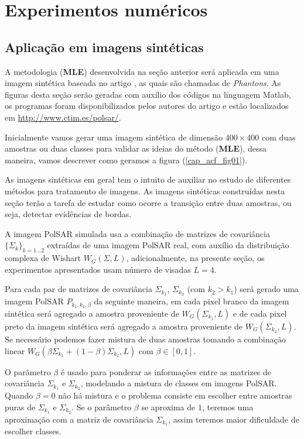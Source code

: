 \chapter{Experimentos numéricos}
\section{Aplicação em imagens sintéticas}\label{cap_acf_sec4}

A metodologia (\textbf{MLE}) desenvolvida na seção anterior será aplicada em uma imagem sintética baseada no artigo \citep{gamf}, as quais são chamadas de \textit{Phantons}. As figuras desta seção serão geradas com auxílio dos códigos na linguagem Matlab, os programas foram disponibilizados pelos autores do artigo e estão localizados em  \url{http://www.ctim.es/polsar/}.

Inicialmente vamos gerar uma imagem sintética de dimensão $400\times400$ com duas amostras ou duas classes para validar as ideias do método (\textbf{MLE}), dessa maneira, vamos descrever como geramos a figura (\ref{cap_acf_fig01}). 

As imagens sintéticas em geral tem o intuito de auxiliar no estudo de diferentes métodos para tratamento de imagens. As imagens sintéticas construídas nesta seção  terão a tarefa de estudar como ocorre a transição entre duas amostras, ou seja, detectar evidências de bordas. 

A imagem PolSAR simulada usa a combinação de  matrizes de covariância $\{\Sigma_{k}\}_{k=1\dots 2}$ extraídas de uma imagem PolSAR real, com auxílio da distribuição complexa de Wishart $W_G(\Sigma, L)$, adicionalmente, na presente seção, os experimentos apresentados usam número de visadas $L=4$.

Para cada par de matrizes de covariância $\Sigma_{k_1}$, $\Sigma_{k_2}$ (com $k_2>k_1$) será gerado uma imagem PolSAR $P_{k_1,k_2,\beta}$ da seguinte maneira, em cada pixel branco da imagem sintética será agregado a amostra proveniente de $W_G(\Sigma_{k_1}, L)$ e de cada pixel preto da imagem sintética será agregado a amostra proveniente de $W_G(\Sigma_{k_2},L)$. Se necessário podemos fazer mistura de duas amostras tomando a combinação linear $W_G(\beta\Sigma_{k_1}+(1-\beta)\Sigma_{k_2}, L)$ com $\beta\in[0,1]$.

O parâmetro $\beta$ é usado para ponderar as informações entre as matrizes de covariância $\Sigma_{k_1}$ e $\Sigma_{k_2}$, modelando a mistura de classes em imagens PolSAR. Quando $\beta=0$ não há mistura e o problema consiste em escolher entre amostras puras de $\Sigma_{k_1}$ e $\Sigma_{k_2}$. Se o parâmetro $\beta$ se aproxima de $1$, teremos uma aproximação com a matriz de covariância $\Sigma_{k_1}$, assim teremos maior dificuldade de escolher classes. 

